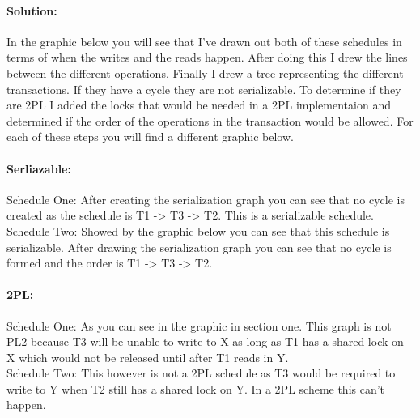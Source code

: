 \documentclass[11pt]{article}
\begin{document}
\paragraph{Solution:} \hfill \break
	In the graphic below you will see that I've drawn out both of these schedules in terms of when the writes and the reads happen. After doing this I drew the lines between the different operations. Finally I drew a tree representing the different transactions. If they have a cycle they are not serializable. To determine if they are 2PL I added the locks that would be needed in a 2PL implementaion and determined if the order of the operations in the transaction would be allowed. For each of these steps you will find a different graphic below.\\

\paragraph{Serliazable:} \hfill \break
Schedule One:
After creating the serialization graph you can see that no cycle is created as the schedule is T1 -> T3 -> T2. This is a serializable schedule.\\


Schedule Two: Showed by the graphic below you can see that this schedule is serializable. After drawing the serialization graph you can see that no cycle is formed and the order is T1 -> T3 -> T2.\\

\paragraph{2PL:} \hfill \break
Schedule One: As you can see in the graphic in section one. This graph is not PL2 because T3 will be unable to write to X as long as T1 has a shared lock on X which would not be released until after T1 reads in Y.\\

Schedule Two: This however is not a 2PL schedule as T3 would be required to write to Y when T2 still has a shared lock on Y. In a 2PL scheme this can't happen.\\
\end{document}
